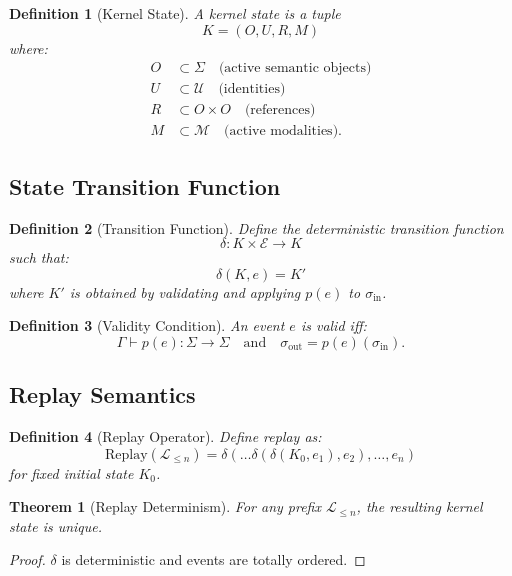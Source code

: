 \documentclass[11pt]{article}
\newtheorem{definition}{Definition}
\newtheorem{theorem}{Theorem}
\begin{document}
\begin{definition}[Kernel State]
A kernel state is a tuple
\[
K = (O, U, R, M)
\]
where:
\begin{align*}
O &\subset \Sigma \quad \text{(active semantic objects)} \\
U &\subset \mathcal{U} \quad \text{(identities)} \\
R &\subset O \times O \quad \text{(references)} \\
M &\subset \mathcal{M} \quad \text{(active modalities)}.
\end{align*}
\end{definition}

\subsection{State Transition Function}

\begin{definition}[Transition Function]
Define the deterministic transition function
\[
\delta : K \times \mathcal{E} \to K
\]
such that:
\[
\delta(K, e) = K'
\]
where $K'$ is obtained by validating and applying $p(e)$ to $\sigma_{\text{in}}$.
\end{definition}

\begin{definition}[Validity Condition]
An event $e$ is valid iff:
\[
\Gamma \vdash p(e) : \Sigma \to \Sigma
\quad \text{and} \quad
\sigma_{\text{out}} = p(e)(\sigma_{\text{in}}).
\]
\end{definition}

\subsection{Replay Semantics}

\begin{definition}[Replay Operator]
Define replay as:
\[
\text{Replay}(\mathcal{L}_{\le n}) = \delta(\dots \delta(\delta(K_0, e_1), e_2), \dots, e_n)
\]
for fixed initial state $K_0$.
\end{definition}

\begin{theorem}[Replay Determinism]
For any prefix $\mathcal{L}_{\le n}$, the resulting kernel state is unique.
\end{theorem}

\begin{proof}
$\delta$ is deterministic and events are totally ordered.
\end{proof}
\end{document}
